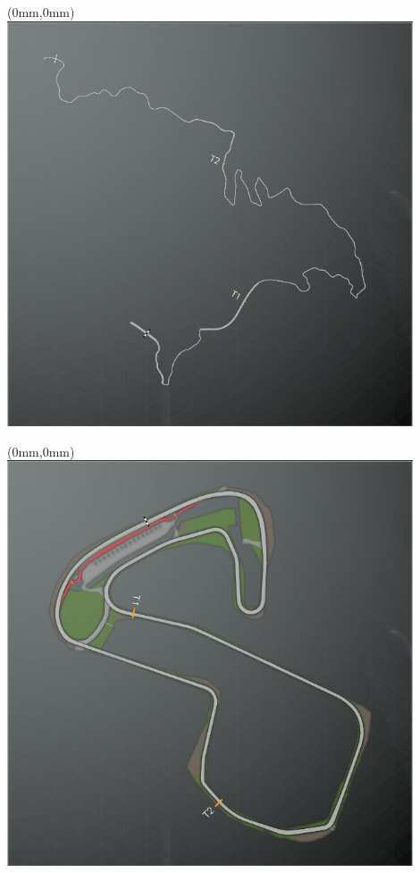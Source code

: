 \null\newpage
\begin{textblock*}{30mm}(0mm,0mm)%
\includegraphics[width=120mm]{TR/2015-05-20_00002.png}
\end{textblock*}
\null\newpage
\begin{textblock*}{30mm}(0mm,0mm)%
\includegraphics[width=120mm]{TR/2015-05-20_00007.png}
\end{textblock*}
